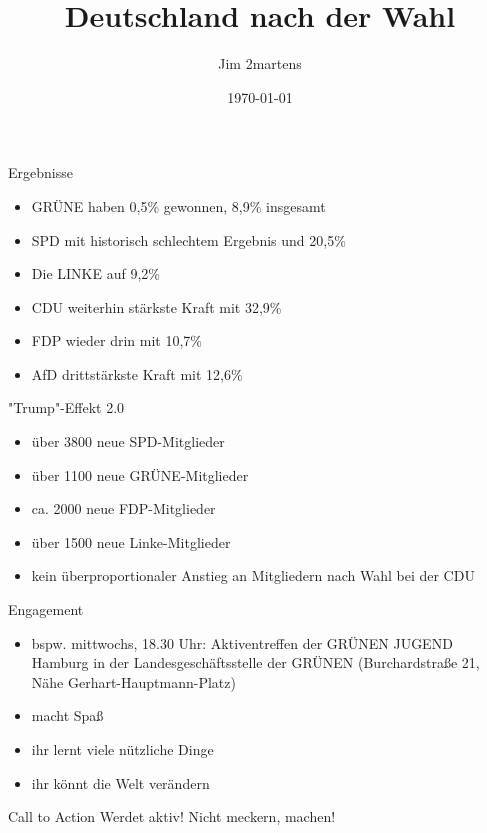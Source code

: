 \documentclass{beamer}
\begin{document}
\author{Jim 2martens}
\title{Deutschland nach der Wahl}
\date{\today}

\begin{frame}
    \titlepage
\end{frame}

\begin{frame}{Ergebnisse}
    \begin{itemize}
        \item GRÜNE haben 0,5\% gewonnen, 8,9\% insgesamt
        \vfill
        \item SPD mit historisch schlechtem Ergebnis und 20,5\%
        \vfill
        \item Die LINKE auf 9,2\%
        \vfill
        \item CDU weiterhin stärkste Kraft mit 32,9\%
        \vfill
        \item FDP wieder drin mit 10,7\%
        \vfill
        \item AfD drittstärkste Kraft mit 12,6\%
    \end{itemize}
\end{frame}

\begin{frame}{"Trump"-Effekt 2.0}
    \begin{itemize}
        \item über 3800 neue SPD-Mitglieder
        \vfill
        \item über 1100 neue GRÜNE-Mitglieder
        \vfill
        \item ca. 2000 neue FDP-Mitglieder
        \vfill
        \item über 1500 neue Linke-Mitglieder
        \vfill
        \item kein überproportionaler Anstieg an Mitgliedern nach Wahl bei der CDU
    \end{itemize}
\end{frame}

\begin{frame}{Engagement}
    \begin{itemize}
        \item bspw. mittwochs, 18.30 Uhr: Aktiventreffen der GRÜNEN JUGEND Hamburg
        in der Landesgeschäftsstelle der GRÜNEN (Burchardstraße 21, Nähe Gerhart-Hauptmann-Platz)
        \vfill
        \item macht Spaß
        \vfill
        \item ihr lernt viele nützliche Dinge
        \vfill
        \item ihr könnt die Welt verändern
    \end{itemize}
\end{frame}

\begin{frame}{Call to Action}
    \centering
    Werdet aktiv! Nicht meckern, machen!
\end{frame}
\end{document}
